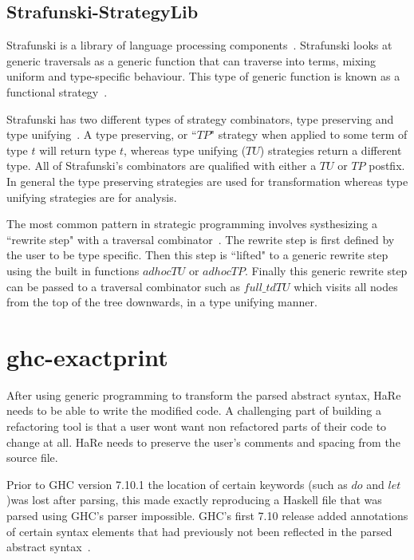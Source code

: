 \subsection{Strafunski-StrategyLib}\label{strafunskiSection}
Strafunski is a library of language processing components~\citep{strafunski}. Strafunski looks at generic traversals as a generic function that can traverse into terms, mixing uniform and type-specific behaviour. This type of generic function is known as a functional strategy~\citep{strafunski}.

Strafunski has two different types of strategy combinators, type preserving and type unifying~\citep{strafunski}. A type preserving, or ``$TP$" strategy when applied to some term of type $t$ will return type $t$, whereas type unifying ($TU$) strategies return a different type. All of Strafunski's combinators are qualified with either a $TU$ or $TP$ postfix. In general the type preserving strategies are used for transformation whereas type unifying strategies are for analysis. 

The most common pattern in strategic programming involves systhesizing a ``rewrite step" with a traversal combinator~\citep{strafunski}. The rewrite step is first defined by the user to be type specific. Then this step is ``lifted" to a generic rewrite step using the built in functions $adhocTU$ or $adhocTP$. Finally this generic rewrite step can be passed to a traversal combinator such as $full\_tdTU$ which visits all nodes from the top of the tree downwards, in a type unifying manner.

\section{ghc-exactprint}

After using generic programming to transform the parsed abstract syntax, HaRe needs to be able to write the modified code. A challenging part of building a refactoring tool is that a user wont want non refactored parts of their code to change at all. HaRe needs to preserve the user's comments and spacing from the source file.

Prior to GHC version 7.10.1 the location of certain keywords (such as $do$ and $let$)was lost after parsing, this made exactly reproducing a Haskell file that was parsed using GHC's parser impossible. GHC's first 7.10 release added annotations of certain syntax elements that had previously not been reflected in the parsed abstract syntax~\citep{apiAnns}. 

